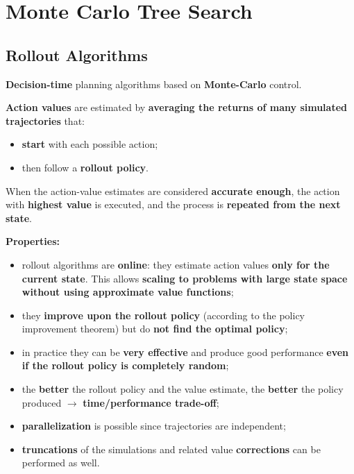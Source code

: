 \documentclass[11pt,a4paper]{article}
\theoremstyle{definition}
\theoremstyle{plain}
\theoremstyle{remark}
\begin{document}
\section{Monte Carlo Tree Search}

\subsection{Rollout Algorithms}

\begin{tcolorbox}[colback=blue!5!white, colframe=blue!60!black, title={Rollout Algorithms}]
\textbf{Decision-time} planning algorithms based on \textbf{Monte-Carlo} control.
\end{tcolorbox}

\textbf{Action values} are estimated by \textbf{averaging the returns of many simulated trajectories} that:
\begin{itemize}
    \item \textbf{start} with each possible action;
    \item then follow a \textbf{rollout policy}.
\end{itemize}
When the action-value estimates are considered \textbf{accurate enough}, the action with \textbf{highest value} is executed, and the process is \textbf{repeated from the next state}.

\textbf{Properties:}
\begin{itemize}
    \item rollout algorithms are \textbf{online}: they estimate action values \textbf{only for the current state}. This allows \textbf{scaling to problems with large state space without using approximate value functions};
    \item they \textbf{improve upon the rollout policy} (according to the policy improvement theorem) but do \textbf{not find the optimal policy};
    \item in practice they can be \textbf{very effective} and produce good performance \textbf{even if the rollout policy is completely random};
    \item the \textbf{better} the rollout policy and the value estimate, the \textbf{better} the policy produced $\to$ \textbf{time/performance trade-off};
    \item \textbf{parallelization} is possible since trajectories are independent;
    \item \textbf{truncations} of the simulations and related value \textbf{corrections} can be performed as well.
\end{itemize}
\end{document}
